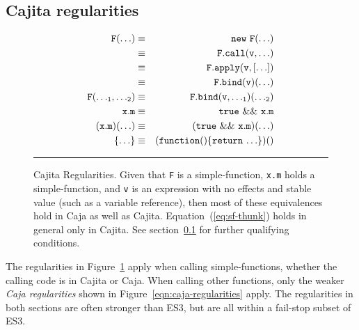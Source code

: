 \documentclass[letterpaper,twocolumn,10pt]{article}
\newcommand{\code}[1]{{\tt {#1}}}              %
\begin{document}
\subsection{Cajita regularities}
\label{subsec:cajita-reg}

\begin{figure}
\begin{eqnarray}
  \code{F(\ldots)}                & \equiv & \code{new\ F(\ldots)}                     \label{eq:sf-new} \\
                                  & \equiv & \code{F.call(v,\ldots)}                   \label{eq:sf-call} \\
                                  & \equiv & \code{F.apply(v,[\ldots])}                \label{eq:sf-apply} \\
                                  & \equiv & \code{F.bind(v)(\ldots)}                  \label{eq:sf-bind-1} \\
  \code{F({\ldots}_1,{\ldots}_2)} & \equiv & \code{F.bind(v,{\ldots}_1)({\ldots}_2)}   \label{eq:sf-bind-n} \\
  \code{x.m}                      & \equiv & \code{true\ \&\&\ x.m}                    \label{eq:sf-true} \\
  \code{(x.m)(\ldots)}            & \equiv & \code{(true\ \&\&\ x.m)(\ldots)}          \label{eq:sf-true-call} \\
  \code{\{{\ldots}\}}             & \equiv & \code{(function()\{return\ {\ldots\}})()} \label{eq:sf-thunk}
\end{eqnarray}

\caption[Cajita Regularities.]{Cajita Regularities. Given that \code{F} is a simple-function, \code{x.m} holds a 
simple-function, and \code{v} is an expression with no effects and stable value (such as a variable reference), then 
most of these equivalences hold in Caja as well as Cajita. Equation~(\ref{eq:sf-thunk}) holds in general only in 
Cajita. See section~\ref{subsec:cajita-reg} for further qualifying conditions. \\ } \hrule
\label{eqn:simple-func}
\end{figure}

The regularities in Figure~\ref{eqn:simple-func} apply when calling simple-functions, whether the 
calling code is in Cajita or Caja. When calling other functions, only the 
weaker \emph{Caja regularities} shown in Figure~\ref{eqn:caja-regularities} apply. The 
regularities in both sections are often stronger than ES3, but are all within 
a fail-stop subset of ES3.
\end{document}
